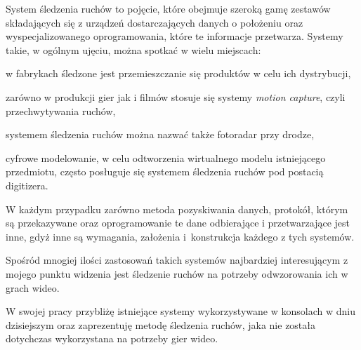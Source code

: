\label{ch:wstep}

System śledzenia ruchów to pojęcie, które obejmuje szeroką gamę zestawów składających się z urządzeń dostarczających danych o położeniu oraz wyspecjalizowanego oprogramowania, które te informacje przetwarza. Systemy takie, w ogólnym ujęciu, można spotkać w wielu miejscach:
\begin{aenumerate}
  \item w fabrykach śledzone jest przemieszczanie się produktów w celu ich dystrybucji,
  \item zarówno w produkcji gier jak i filmów stosuje się systemy \textsl{motion capture}, czyli przechwytywania ruchów,
  \item systemem śledzenia ruchów można nazwać także fotoradar przy drodze,
  \item cyfrowe modelowanie, w celu odtworzenia wirtualnego modelu istniejącego przedmiotu, często posługuje się systemem śledzenia ruchów pod postacią digitizera.
\end{aenumerate}

W każdym przypadku zarówno metoda pozyskiwania danych, protokół, którym są przekazywane oraz oprogramowanie te dane odbierające i przetwarzające jest inne, gdyż inne są wymagania, założenia i~konstrukcja każdego z tych systemów.

Spośród mnogiej ilości zastosowań takich systemów najbardziej interesującym z mojego punktu widzenia jest śledzenie ruchów na potrzeby odwzorowania ich w grach wideo.

W swojej pracy przybliżę istniejące systemy wykorzystywane w konsolach w dniu dzisiejszym oraz zaprezentuję metodę śledzenia ruchów, jaka nie została dotychczas wykorzystana na potrzeby gier wideo.


